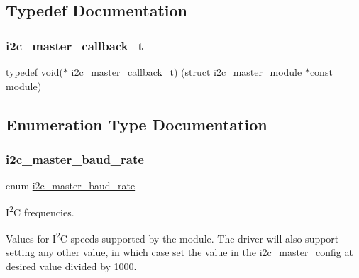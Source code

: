 \subsection{Typedef Documentation}
\mbox{\label{group__asfdoc__sam0__sercom__i2c__group_ga0ef653593dbacc01735c61e59ec3f0da}} 
\subsubsection{\texorpdfstring{i2c\_master\_callback\_t}{i2c\_master\_callback\_t}}
{\footnotesize\ttfamily typedef void($\ast$ i2c\+\_\+master\+\_\+callback\+\_\+t) (struct \mbox{\hyperlink{structi2c__master__module}{i2c\+\_\+master\+\_\+module}} $\ast$const module)}



\subsection{Enumeration Type Documentation}
\mbox{\label{group__asfdoc__sam0__sercom__i2c__group_gace1e0023f2eee92565496a2e30006548}} 
\subsubsection{\texorpdfstring{i2c\_master\_baud\_rate}{i2c\_master\_baud\_rate}}
{\footnotesize\ttfamily enum \mbox{\hyperlink{group__asfdoc__sam0__sercom__i2c__group_gace1e0023f2eee92565496a2e30006548}{i2c\+\_\+master\+\_\+baud\+\_\+rate}}}



I\textsuperscript{2}C frequencies. 

Values for I\textsuperscript{2}C speeds supported by the module. The driver will also support setting any other value, in which case set the value in the \mbox{\hyperlink{structi2c__master__config}{i2c\+\_\+master\+\_\+config}} at desired value divided by 1000.

